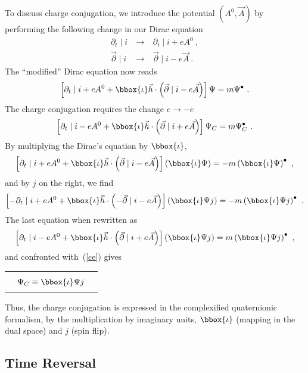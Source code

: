 To discuss charge conjugation, we introduce the potential 
$\left(A^0,\vec{A} \right)$ by performing the following change in our Dirac 
equation
\begin{eqnarray*}
\partial_t \mid i & ~\rightarrow~ & \partial_t \mid i + e A^0~,\\
\vec{\partial} \mid i & ~\rightarrow~ & \vec{\partial} \mid i - e \vec{A}~.
\end{eqnarray*}
The ``modified'' Dirac equation now reads
\[ \left[ \partial_t \mid i + e A^0 + \bbox{\iota} \vec{h} \cdot 
   \left( \vec{\partial} \mid i - e \vec{A} \right) \right]
    \Psi  = m \Psi^{\bullet}~. \] 
The charge conjugation requires the change $e \rightarrow -e$
\begin{equation}
\label{ce}
 \left[ \partial_t \mid i - e A^0 + \bbox{\iota} \vec{h} \cdot 
 \left( \vec{\partial} \mid i + e \vec{A} \right) \right]
 \Psi_C  = m \Psi_C^{\bullet}~.
\end{equation}
By multiplying the Dirac's equation by $\bbox{\iota}$, 
\[ \left[ \partial_t \mid i + e A^0 + \bbox{\iota} \vec{h} \cdot 
   \left( \vec{\partial} \mid i - e \vec{A} \right) \right]
   \left( \bbox{\iota} \Psi \right)  = 
    - m \left( \bbox{\iota} \Psi \right)^{\bullet}~, \] 
and by $j$ on the right, we find 
\[ \left[ -\partial_t \mid i + e A^0 + \bbox{\iota} \vec{h} \cdot 
   \left( -\vec{\partial} \mid i - e \vec{A} \right) \right]
   \left( \bbox{\iota} \Psi j \right)  = 
    - m \left( \bbox{\iota} \Psi j \right)^{\bullet}~. \]
The last equation when rewritten as
\[ \left[ \partial_t \mid i - e A^0 + \bbox{\iota} \vec{h} \cdot 
   \left( \vec{\partial} \mid i + e \vec{A} \right) \right]
   \left( \bbox{\iota} \Psi j \right)  = 
    m \left( \bbox{\iota} \Psi j \right)^{\bullet}~, \]
and confronted with~(\ref{ce}) gives
\begin{center}
\begin{tabular}{|c|} \hline \\ 
~~$\Psi_C \equiv \bbox{\iota} \Psi j$~~\\  \\
\hline
\end{tabular}
\end{center}
Thus, the charge conjugation is expressed in the complexified quaternionic 
formalism, by the multiplication by imaginary units, 
$\bbox{\iota}$ (mapping in the dual space) and $j$ (spin flip).



\subsection{Time Reversal}
\label{s53}

